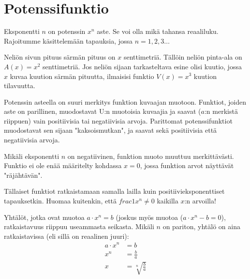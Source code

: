 \chapter{Potenssifunktio}


Eksponentti $n$ on potenssin $x^n$ aste. Se voi olla mikä tahansa reaaliluku. Rajoitumme käsittelemään tapauksia, jossa $n = 1, 2, 3\ldots $

\begin{esimerkki}
Neliön sivun pituus särmän pituus on $x$ senttimetriä. Tällöin neliön pinta-ala on $A(x)=x^2$ senttimetriä. Jos neliön sijaan tarkasteltava esine olisi kuutio, jossa $x$ kuvaa kuution särmän pituutta, ilmaisisi funktio $V(x)=x^3$ kuution tilavuutta.
\end{esimerkki}

Potenssin asteella on suuri merkitys funktion kuvaajan muotoon. Funktiot, joiden aste on parillinen, muodostavat U:n muotoisia kuvaajia ja saavat ($a$:n merkistä riippuen) vain positiivisia tai negatiivisia arvoja. Parittomat potenssifunktiot muodostavat sen sijaan "kaksoismutkan", ja saavat sekä positiivisia että negatiivisia arvoja.


Mikäli eksponentti $n$ on negatiivinen, funktion muoto muuttuu merkittävästi. Funktio ei ole enää määritelty kohdassa $x=0$, jossa funktion arvot näyttävät "räjähtävän".

Tällaiset funktiot ratkaistamaan samalla lailla kuin positiivieksponenttiset tapauksetkin. Huomaa kuitenkin, että $frac{1}{x^n} \neq 0 $ kaikilla $x$:n arvoilla!  




Yhtälöt, jotka ovat muotoa $a\cdot x^n = b$ (joskus myös muotoa  ($a\cdot x^n - b = 0$), ratkaistavuus riippuu useammasta seikasta. Mikäli $n$ on pariton, yhtälö on aina ratkaistavissa (eli sillä on reaalinen juuri):
\begin{align*}
a\cdot x^n &= b \\
x^n &= \frac{b}{a} \\
x &= \sqrt[n]{\frac{b}{a}}
\end{align*}

